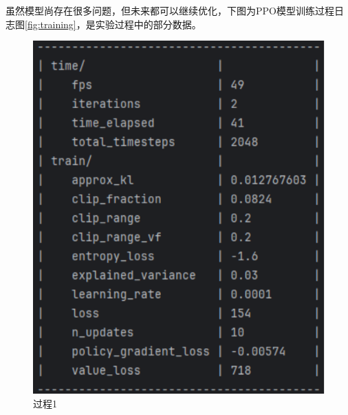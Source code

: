 虽然模型尚存在很多问题，但未来都可以继续优化，下图为PPO模型训练过程日志图\ref{fig:training}，是实验过程中的部分数据。

\begin{figure}[H]
    \centering
    \begin{minipage}{0.24\textwidth}
        \centering
        \includegraphics[width=\textwidth]{images/training1.pdf}
	   \caption*{过程1}
    \end{minipage}%
    \begin{minipage}{0.24\textwidth}
        \centering

\end{minipage}
\end{figure}
